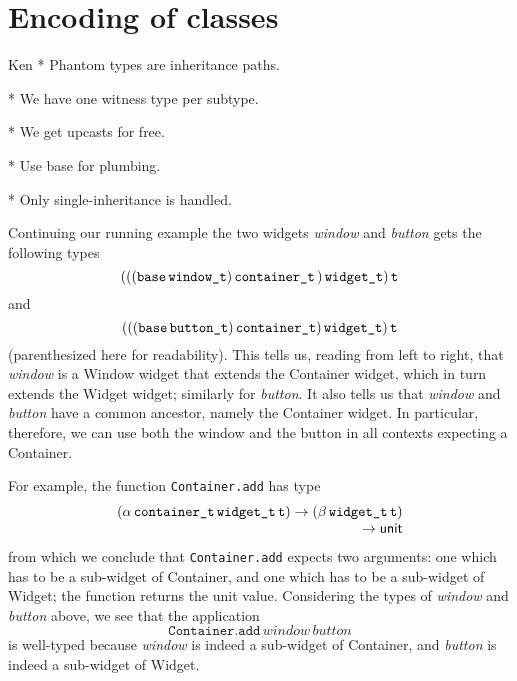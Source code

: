 \documentclass[workingdraft,endnotes]{usetex-v1}
\begin{document}
\section{Encoding of classes}
\label{sec:encoding-classes}


\begin{ednote}{Ken}
  * Phantom types are inheritance paths.

  * We have one witness type per subtype.
  
  * We get upcasts for free.
  
  * Use base for plumbing.

  * Only single-inheritance is handled.
\end{ednote}


Continuing our running example the two widgets
\textit{window} and \textit{button} gets the following
types
\begin{displaymath}
(((\texttt{base}\,{\texttt{window\_t}})\,{\texttt{container\_t}}\,{)}\,{\texttt{widget\_t}})\,{\texttt{t}}
\end{displaymath}
and
\begin{displaymath}
(((\texttt{base}\,{\texttt{button\_t}})\,{\texttt{container\_t}})\,{\texttt{widget\_t}})\,{\texttt{t}}
\end{displaymath}
(parenthesized here for readability). This tells us, reading from left
to right, that \textit{window} is a Window widget that extends the
Container widget, which in turn extends the Widget widget; similarly
for \textit{button}. It also tells us that \textit{window} and
\textit{button} have a common ancestor, namely the Container widget.
In particular, therefore, we can use both the window and the button in
all contexts expecting a Container.

For example, the function \texttt{Container.add} has type
\begin{displaymath}\begin{array}{l}
(\tApp{\tApp{\tApp{\alpha}{\tWitness{container}}}{\tWitness{widget}}}{\tName{t}})
\rightarrow
(\tApp{\tApp{\beta}{\tWitness{widget}}}{\tName{t}})
\\
\multicolumn{1}{r}{\rightarrow{\tUnit}}
\end{array}\end{displaymath}
from which we conclude that \texttt{Container.add} expects two arguments:
one which has to be a sub-widget of Container, and one which has to be
a sub-widget of Widget; the function returns the unit value. Considering
the types of \textit{window} and \textit{button} above, we see that
the application
\begin{displaymath}
\texttt{Container.add}\,\textit{window}\,\textit{button}
\end{displaymath}
is well-typed because \textit{window} is indeed a sub-widget of 
Container, and \textit{button} is indeed a sub-widget of Widget.
\end{document}
